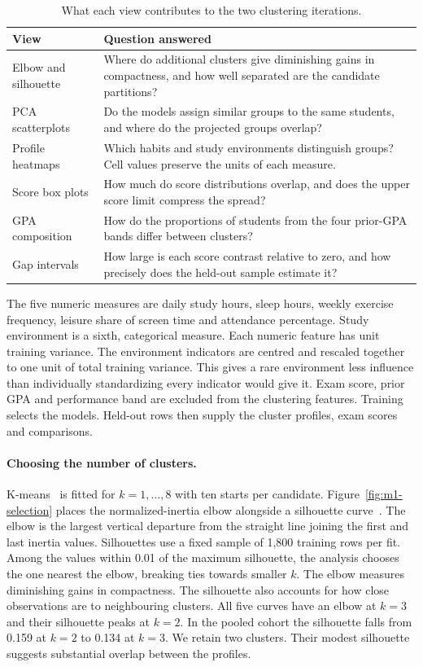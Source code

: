 \begin{table}[htbp]\centering\small
\caption{What each view contributes to the two clustering iterations.}
\label{tab:m1-tasks}
\begin{tabular}{@{}p{.23\linewidth}p{.70\linewidth}@{}}
\toprule
View & Question answered \\
\midrule
Elbow and silhouette & Where do additional clusters give diminishing gains in compactness, and how well separated are the candidate partitions? \\
PCA scatterplots & Do the models assign similar groups to the same students, and where do the projected groups overlap? \\
Profile heatmaps & Which habits and study environments distinguish groups? Cell values preserve the units of each measure. \\
Score box plots & How much do score distributions overlap, and does the upper score limit compress the spread? \\
GPA composition & How do the proportions of students from the four prior-GPA bands differ between clusters? \\
Gap intervals & How large is each score contrast relative to zero, and how precisely does the held-out sample estimate it? \\
\bottomrule
\end{tabular}
\end{table}

The five numeric measures are daily study hours, sleep hours, weekly exercise
frequency, leisure share of screen time and attendance percentage. Study
environment is a sixth, categorical measure. Each numeric feature has unit
training variance. The environment indicators are centred and rescaled
together to one unit of total training variance. This gives a rare environment
less influence than individually standardizing every indicator would give it.
Exam score, prior GPA and performance band are excluded from the clustering
features. Training selects the models. Held-out rows then supply the cluster
profiles, exam scores and comparisons.

\paragraph{Choosing the number of clusters.}
K-means~\cite{lloyd1982} is fitted for $k=1,\ldots,8$ with ten starts per
candidate. Figure~\ref{fig:m1-selection} places the normalized-inertia elbow
alongside a silhouette curve~\cite{rousseeuw1987}. The elbow is the largest
vertical departure from the straight line joining the first and last
inertia values. Silhouettes use a fixed sample of 1,800 training rows per
fit. Among the values within 0.01 of the maximum silhouette, the analysis
chooses the one nearest the elbow, breaking ties towards smaller $k$.
The elbow measures diminishing gains in compactness. The silhouette also
accounts for how close observations are to neighbouring clusters.
All five curves have an elbow at $k=3$ and their silhouette peaks at
$k=2$. In the pooled cohort the silhouette falls from 0.159 at $k=2$ to
0.134 at $k=3$. We retain two clusters. Their modest silhouette suggests
substantial overlap between the profiles.

